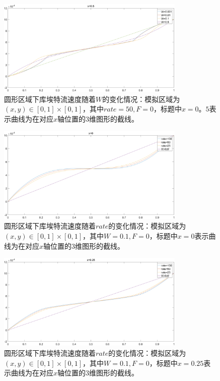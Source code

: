 \documentclass[11pt,UTF8]{ctexart}
\begin{document}
    \begin{figure}[h]
        \centerline{\includegraphics[width=0.8\textwidth]{Circul_P_W/x=0_5.png}}
        \caption{圆形区域下库埃特流速度随着$W$的变化情况：模拟区域为$(x,y)\in [0,1]\times [0,1]$，其中$rate=50,F=0$，标题中$x=0。5$表示曲线为在对应$x$轴位置的3维图形的截线。}
        \label{img13}
    \end{figure}
    \begin{figure}[h]
        \centerline{\includegraphics[width=0.8\textwidth]{Circul_P_rate/x=0.png}}
        \caption{圆形区域下库埃特流速度随着$rate$的变化情况：模拟区域为$(x,y)\in [0,1]\times [0,1]$，其中$W=0.1,F=0$，标题中$x=0$表示曲线为在对应$x$轴位置的3维图形的截线。}
        \label{img14}
    \end{figure}
    \begin{figure}[h]
        \centerline{\includegraphics[width=0.8\textwidth]{Circul_P_rate/x=0_25.png}}
        \caption{圆形区域下库埃特流速度随着$rate$的变化情况：模拟区域为$(x,y)\in [0,1]\times [0,1]$，其中$W=0.1,F=0$，标题中$x=0.25$表示曲线为在对应$x$轴位置的3维图形的截线。}
        \label{img15}
    \end{figure}
\end{document}
